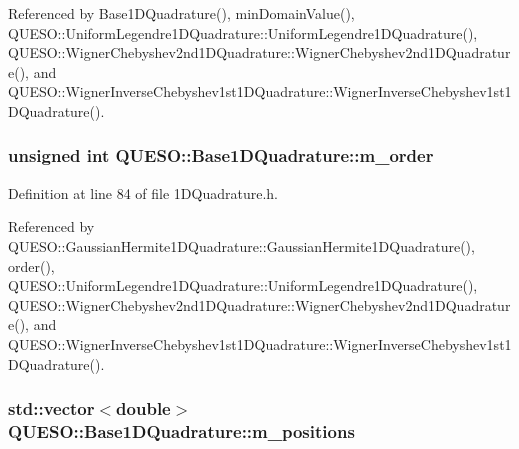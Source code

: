 Referenced by Base1\-D\-Quadrature(), min\-Domain\-Value(), Q\-U\-E\-S\-O\-::\-Uniform\-Legendre1\-D\-Quadrature\-::\-Uniform\-Legendre1\-D\-Quadrature(), Q\-U\-E\-S\-O\-::\-Wigner\-Chebyshev2nd1\-D\-Quadrature\-::\-Wigner\-Chebyshev2nd1\-D\-Quadrature(), and Q\-U\-E\-S\-O\-::\-Wigner\-Inverse\-Chebyshev1st1\-D\-Quadrature\-::\-Wigner\-Inverse\-Chebyshev1st1\-D\-Quadrature().

\hypertarget{class_q_u_e_s_o_1_1_base1_d_quadrature_a78ba0750b7220b302e4cd1415c7d4c48}{
\subsubsection[{m\-\_\-order}]{\setlength{\rightskip}{0pt plus 5cm}unsigned int Q\-U\-E\-S\-O\-::\-Base1\-D\-Quadrature\-::m\-\_\-order\hspace{0.3cm}{\ttfamily [protected]}}}\label{class_q_u_e_s_o_1_1_base1_d_quadrature_a78ba0750b7220b302e4cd1415c7d4c48}


Definition at line 84 of file 1\-D\-Quadrature.\-h.



Referenced by Q\-U\-E\-S\-O\-::\-Gaussian\-Hermite1\-D\-Quadrature\-::\-Gaussian\-Hermite1\-D\-Quadrature(), order(), Q\-U\-E\-S\-O\-::\-Uniform\-Legendre1\-D\-Quadrature\-::\-Uniform\-Legendre1\-D\-Quadrature(), Q\-U\-E\-S\-O\-::\-Wigner\-Chebyshev2nd1\-D\-Quadrature\-::\-Wigner\-Chebyshev2nd1\-D\-Quadrature(), and Q\-U\-E\-S\-O\-::\-Wigner\-Inverse\-Chebyshev1st1\-D\-Quadrature\-::\-Wigner\-Inverse\-Chebyshev1st1\-D\-Quadrature().

\hypertarget{class_q_u_e_s_o_1_1_base1_d_quadrature_aeda387c028c3ba89ea0f9637a2234212}{
\subsubsection[{m\-\_\-positions}]{\setlength{\rightskip}{0pt plus 5cm}std\-::vector$<$double$>$ Q\-U\-E\-S\-O\-::\-Base1\-D\-Quadrature\-::m\-\_\-positions\hspace{0.3cm}{\ttfamily [protected]}}}\label{class_q_u_e_s_o_1_1_base1_d_quadrature_aeda387c028c3ba89ea0f9637a2234212}


